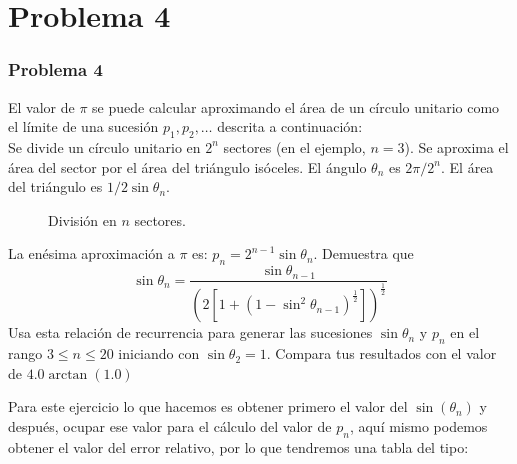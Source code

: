\section{Problema 4}
\begin{frame}
\frametitle{Problema 4}
El valor de $\pi$ se puede calcular aproximando el \'{a}rea de un c\'{i}rculo unitario como el l\'{i}mite de una sucesi\'{o}n $p_{1}, p_{2}, \ldots$ descrita a continuaci\'{o}n:
\\
Se divide un c\'{i}rculo unitario en $2^{n}$ sectores (en el ejemplo, $n=3$). Se aproxima el \'{a}rea del sector por el \'{a}rea del tri\'{a}ngulo is\'{o}celes. El \'{a}ngulo $\theta_{n}$ es $2 \pi / 2^{n}$. El \'{a}rea del tri\'{a}ngulo es $1/2 \sin \theta_{n}$.
\end{frame}
\begin{frame}
\begin{figure}[H]
\centering
{}
\caption{Divisi\'{o}n en $n$ sectores.}
\end{figure}
\end{frame}
\begin{frame}
La en\'{e}sima aproximaci\'{o}n a $\pi$ es: $p_{n}= 2^{n-1} \sin \theta_{n}$. Demuestra que
\[\sin \theta_{n} = \dfrac{\sin \theta_{n-1}}{\left( 2 \left[ 1+ (1-\sin^{2}\theta_{n-1})^{\frac{1}{2}} \right] \right)^{\frac{1}{2}}} \]
Usa esta relaci\'{o}n de recurrencia para generar las sucesiones $\sin \theta_{n}$ y $p_{n}$ en el rango $3 \leq n \leq 20$ iniciando con $\sin \theta_{2}=1$. Compara tus resultados con el valor de $4.0 \arctan(1.0)$
\end{frame}
\begin{frame}
Para este ejercicio lo que hacemos es obtener primero el valor del $\sin(\theta_{n})$ y despu\'{e}s, ocupar ese valor para el c\'{a}lculo del valor de $p_{n}$, aqu\'{i} mismo podemos obtener el valor del error relativo, por lo que tendremos una tabla del tipo:
\end{frame}
